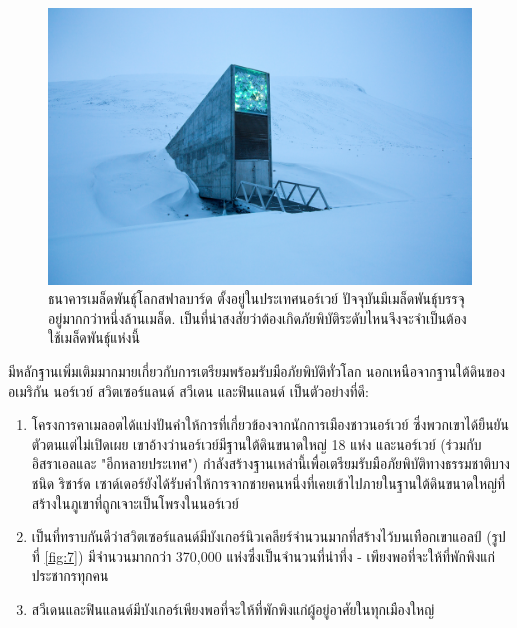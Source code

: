 \documentclass[10pt,twocolumn,letterpaper]{article}
\begin{document}
\begin{figure}[t]
\begin{center}
\includegraphics[width=1\linewidth]{svalbard.jpg}
\end{center}
   \caption{ธนาคารเมล็ดพันธุ์โลกสฟาลบาร์ด ตั้งอยู่ในประเทศนอร์เวย์ ปัจจุบันมีเมล็ดพันธุ์บรรจุอยู่มากกว่าหนึ่งล้านเมล็ด\cite{24}. เป็นที่น่าสงสัยว่าต้องเกิดภัยพิบัติระดับไหนจึงจะจำเป็นต้องใช้เมล็ดพันธุ์แห่งนี้ }
\label{fig:8}
\label{fig:onecol}
\end{figure}

มีหลักฐานเพิ่มเติมมากมายเกี่ยวกับการเตรียมพร้อมรับมือภัยพิบัติทั่วโลก นอกเหนือจากฐานใต้ดินของอเมริกัน นอร์เวย์ สวิตเซอร์แลนด์ สวีเดน และฟินแลนด์ เป็นตัวอย่างที่ดี:

\begin{flushleft}
\begin{enumerate}
    \item โครงการคาเมลอตได้แบ่งปันคำให้การที่เกี่ยวข้องจากนักการเมืองชาวนอร์เวย์ \cite{25,26} ซึ่งพวกเขาได้ยืนยันตัวตนแต่ไม่เปิดเผย เขาอ้างว่านอร์เวย์มีฐานใต้ดินขนาดใหญ่ 18 แห่ง และนอร์เวย์ (ร่วมกับอิสราเอลและ "อีกหลายประเทศ") กำลังสร้างฐานเหล่านี้เพื่อเตรียมรับมือภัยพิบัติทางธรรมชาติบางชนิด ริชาร์ด เซาด์เดอร์ยังได้รับคำให้การจากชายคนหนึ่งที่เคยเข้าไปภายในฐานใต้ดินขนาดใหญ่ที่สร้างในภูเขาที่ถูกเจาะเป็นโพรงในนอร์เวย์ \cite{22}
    \item เป็นที่ทราบกันดีว่าสวิตเซอร์แลนด์มีบังเกอร์นิวเคลียร์จำนวนมากที่สร้างไว้บนเทือกเขาแอลป์ (รูปที่ \ref{fig:7}) มีจำนวนมากกว่า 370,000 แห่งซึ่งเป็นจำนวนที่น่าทึ่ง - เพียงพอที่จะให้ที่พักพิงแก่ประชากรทุกคน \cite{27}
    \item สวีเดนและฟินแลนด์มีบังเกอร์เพียงพอที่จะให้ที่พักพิงแก่ผู้อยู่อาศัยในทุกเมืองใหญ่ \cite{27}
\end{enumerate}
\end{flushleft}
\end{document}
